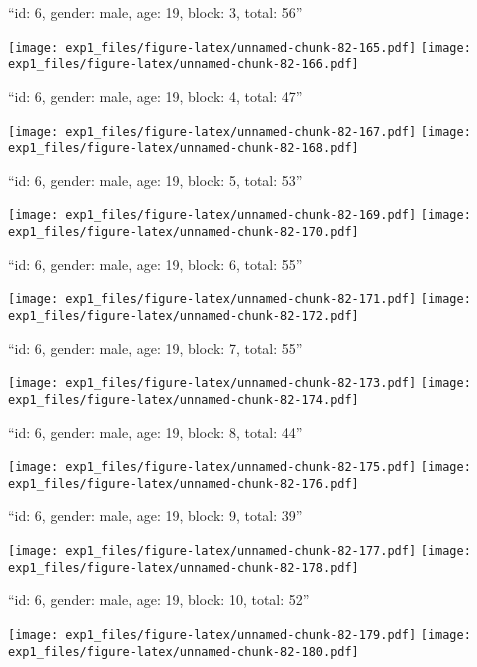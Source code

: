 \documentclass[11pt,,]{article}
\begin{document}
\newpage
[1] 

``id: 6, gender: male, age: 19, block: 3, total: 56''

\texttt{[image: exp1\_files/figure-latex/unnamed-chunk-82-165.pdf]}
\texttt{[image: exp1\_files/figure-latex/unnamed-chunk-82-166.pdf]}

\newpage
[1] 

``id: 6, gender: male, age: 19, block: 4, total: 47''

\texttt{[image: exp1\_files/figure-latex/unnamed-chunk-82-167.pdf]}
\texttt{[image: exp1\_files/figure-latex/unnamed-chunk-82-168.pdf]}

\newpage
[1] 

``id: 6, gender: male, age: 19, block: 5, total: 53''

\texttt{[image: exp1\_files/figure-latex/unnamed-chunk-82-169.pdf]}
\texttt{[image: exp1\_files/figure-latex/unnamed-chunk-82-170.pdf]}

\newpage
[1] 

``id: 6, gender: male, age: 19, block: 6, total: 55''

\texttt{[image: exp1\_files/figure-latex/unnamed-chunk-82-171.pdf]}
\texttt{[image: exp1\_files/figure-latex/unnamed-chunk-82-172.pdf]}

\newpage
[1] 

``id: 6, gender: male, age: 19, block: 7, total: 55''

\texttt{[image: exp1\_files/figure-latex/unnamed-chunk-82-173.pdf]}
\texttt{[image: exp1\_files/figure-latex/unnamed-chunk-82-174.pdf]}

\newpage
[1] 

``id: 6, gender: male, age: 19, block: 8, total: 44''

\texttt{[image: exp1\_files/figure-latex/unnamed-chunk-82-175.pdf]}
\texttt{[image: exp1\_files/figure-latex/unnamed-chunk-82-176.pdf]}

\newpage
[1] 

``id: 6, gender: male, age: 19, block: 9, total: 39''

\texttt{[image: exp1\_files/figure-latex/unnamed-chunk-82-177.pdf]}
\texttt{[image: exp1\_files/figure-latex/unnamed-chunk-82-178.pdf]}

\newpage
[1] 

``id: 6, gender: male, age: 19, block: 10, total: 52''

\texttt{[image: exp1\_files/figure-latex/unnamed-chunk-82-179.pdf]}
\texttt{[image: exp1\_files/figure-latex/unnamed-chunk-82-180.pdf]}
\end{document}
